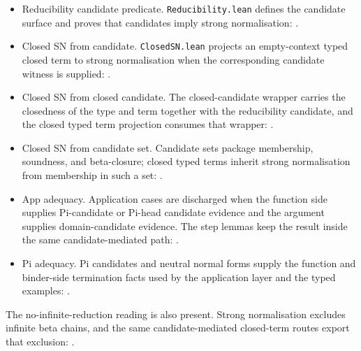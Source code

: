 \begin{itemize}
\item Reducibility candidate predicate. \texttt{Reducibility.lean} defines the
  candidate surface and proves that candidates imply strong normalisation:
  .
\item Closed SN from candidate. \texttt{ClosedSN.lean} projects an empty-context
  typed closed term to strong normalisation when the corresponding candidate
  witness is supplied:
  .
\item Closed SN from closed candidate. The closed-candidate wrapper carries the
  closedness of the type and term together with the reducibility candidate, and
  the closed typed term projection consumes that wrapper:
  .
\item Closed SN from candidate set. Candidate sets package membership,
  soundness, and beta-closure; closed typed terms inherit strong normalisation
  from membership in such a set:
  .
\item App adequacy. Application cases are discharged when the function side
  supplies Pi-candidate or Pi-head candidate evidence and the argument supplies
  domain-candidate evidence. The step lemmas keep the result inside the same
  candidate-mediated path:
  .
\item Pi adequacy. Pi candidates and neutral normal forms supply the function
  and binder-side termination facts used by the application layer and the typed
  examples:
  .
\end{itemize}

The no-infinite-reduction reading is also present. Strong normalisation excludes
infinite beta chains, and the same candidate-mediated closed-term routes export
that exclusion:
.


